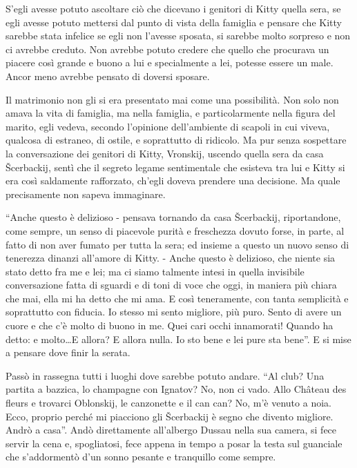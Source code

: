 S'egli avesse potuto ascoltare ciò che dicevano i genitori di Kitty quella sera, se egli avesse potuto mettersi dal punto di vista della famiglia e pensare che Kitty sarebbe stata infelice se egli non l'avesse sposata, si sarebbe molto sorpreso e non ci avrebbe creduto. Non avrebbe potuto credere che quello che procurava un piacere così grande e buono a lui e specialmente a lei, potesse essere un male. Ancor meno avrebbe pensato di doversi sposare. 

Il matrimonio non gli si era presentato mai come una possibilità. Non solo non amava la vita di famiglia, ma nella famiglia, e particolarmente nella figura del marito, egli vedeva, secondo l'opinione dell'ambiente di scapoli in cui viveva, qualcosa di estraneo, di ostile, e soprattutto di ridicolo. Ma pur senza sospettare la conversazione dei genitori di Kitty, Vronskij, uscendo quella sera da casa Šcerbackij, sentì che il segreto legame sentimentale che esisteva tra lui e Kitty si era così saldamente rafforzato, ch'egli doveva prendere una decisione. Ma quale precisamente non sapeva immaginare. 

``Anche questo è delizioso - pensava tornando da casa Šcerbackij, riportandone, come sempre, un senso di piacevole purità e freschezza dovuto forse, in parte, al fatto di non aver fumato per tutta la sera; ed insieme a questo un nuovo senso di tenerezza dinanzi all'amore di Kitty. - Anche questo è delizioso, che niente sia stato detto fra me e lei; ma ci siamo talmente intesi in quella invisibile conversazione fatta di sguardi e di toni di voce che oggi, in maniera più chiara che mai, ella mi ha detto che mi ama. E così teneramente, con tanta semplicità e soprattutto con fiducia. Io stesso mi sento migliore, più puro. Sento di avere un cuore e che c'è molto di buono in me. Quei cari occhi innamorati! Quando ha detto: e molto\ldots{}E allora? E allora nulla. Io sto bene e lei pure sta bene''. E si mise a pensare dove finir la serata. 

Passò in rassegna tutti i luoghi dove sarebbe potuto andare. ``Al club? Una partita a bazzica, lo champagne con Ignatov? No, non ci vado. Allo Château des fleurs e trovarci Oblonskij, le canzonette e il can can? No, m'è venuto a noia. Ecco, proprio perché mi piacciono gli Šcerbackij è segno che divento migliore. Andrò a casa''. Andò direttamente all'albergo Dussau nella sua camera, si fece servir la cena e, spogliatosi, fece appena in tempo a posar la testa sul guanciale che s'addormentò d'un sonno pesante e tranquillo come sempre. 

